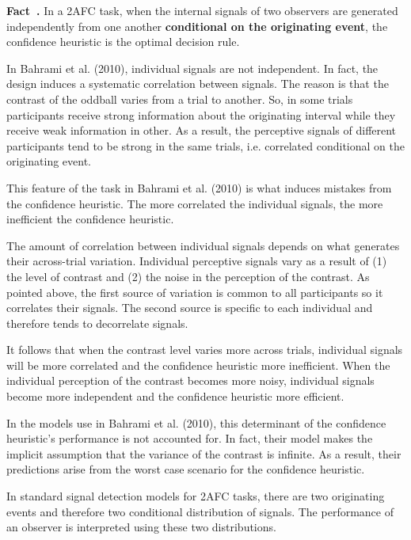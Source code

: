 \documentclass[12pt]{report}
\newcounter{example}[section]
\newenvironment{fact}[1][]{\refstepcounter{example}\par\medskip
   \noindent \textbf{Fact~\theexample. #1} \rmfamily}{\medskip}
\begin{document}
\begin{fact}In a 2AFC task, when the internal signals of two observers are generated independently from one another \textbf{conditional on the originating event}, the confidence heuristic is the optimal decision rule. \end{fact}

In Bahrami et al. (2010), individual signals are not independent. In fact, the design induces a systematic correlation between signals. The reason is that the contrast of the oddball varies from a trial to another. So, in some trials participants receive strong information about the originating interval while they receive weak information in other. As a result, the perceptive signals of different participants tend to be strong in the same trials, i.e. correlated conditional on the originating event. 

This feature of the task in Bahrami et al. (2010) is what induces mistakes from the confidence heuristic. The more correlated the individual signals, the more inefficient the confidence heuristic. 

The amount of correlation between individual signals depends on what generates their across-trial variation. Individual perceptive signals vary as a result of (1) the level of contrast and (2) the noise in the perception of the contrast. As pointed above, the first source of variation is common to all participants so it correlates their signals. The second source is specific to each individual and therefore tends to decorrelate signals. 

It follows that when the contrast level varies more across trials, individual signals will be more correlated and the confidence heuristic more inefficient. When the individual perception of the contrast becomes more noisy, individual signals become more independent and the confidence heuristic more efficient. 

In the models use in Bahrami et al. (2010), this determinant of the confidence heuristic's performance is not accounted for. In fact, their model makes the implicit assumption that the variance of the contrast is infinite. As a result, their predictions arise from the worst case scenario for the confidence heuristic.

In standard signal detection models for 2AFC tasks, there are two originating events and therefore two conditional distribution of signals. The performance of an observer is interpreted using these two distributions. 
\end{document}
